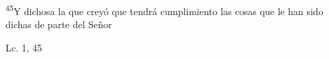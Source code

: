 \documentclass[../../rosario.tex]{subfiles}
\begin{document}
\textsuperscript{45}Y dichosa la que creyó que tendrá cumplimiento las cosas que le han sido dichas de parte del Señor
\begin{flushright}
  Lc. 1, 45         
\end{flushright}
\end{document}
